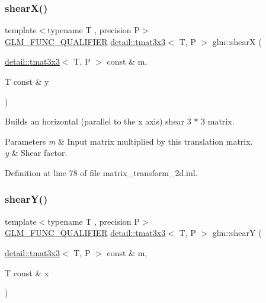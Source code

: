 \subsubsection{\texorpdfstring{shear\+X()}{shearX()}}
{\footnotesize\ttfamily template$<$typename T , precision P$>$ \\
\hyperlink{setup_8hpp_a33fdea6f91c5f834105f7415e2a64407}{G\+L\+M\+\_\+\+F\+U\+N\+C\+\_\+\+Q\+U\+A\+L\+I\+F\+I\+ER} \hyperlink{structglm_1_1detail_1_1tmat3x3}{detail\+::tmat3x3}$<$ T, P $>$ glm\+::shearX (\begin{DoxyParamCaption}\item[{\hyperlink{structglm_1_1detail_1_1tmat3x3}{detail\+::tmat3x3}$<$ T, P $>$ const \&}]{m,  }\item[{T const \&}]{y }\end{DoxyParamCaption})}

Builds an horizontal (parallel to the x axis) shear 3 $\ast$ 3 matrix.


\begin{DoxyParams}{Parameters}
{\em m} & Input matrix multiplied by this translation matrix. \\
\hline
{\em y} & Shear factor. \\
\hline
\end{DoxyParams}


Definition at line 78 of file matrix\+\_\+transform\+\_\+2d.\+inl.

\mbox{\label{group__gtx__matrix__transform__2d_ga04dd04815c1c8ee0bd49e6ae499d8252}} 
\subsubsection{\texorpdfstring{shear\+Y()}{shearY()}}
{\footnotesize\ttfamily template$<$typename T , precision P$>$ \\
\hyperlink{setup_8hpp_a33fdea6f91c5f834105f7415e2a64407}{G\+L\+M\+\_\+\+F\+U\+N\+C\+\_\+\+Q\+U\+A\+L\+I\+F\+I\+ER} \hyperlink{structglm_1_1detail_1_1tmat3x3}{detail\+::tmat3x3}$<$ T, P $>$ glm\+::shearY (\begin{DoxyParamCaption}\item[{\hyperlink{structglm_1_1detail_1_1tmat3x3}{detail\+::tmat3x3}$<$ T, P $>$ const \&}]{m,  }\item[{T const \&}]{x }\end{DoxyParamCaption})}

